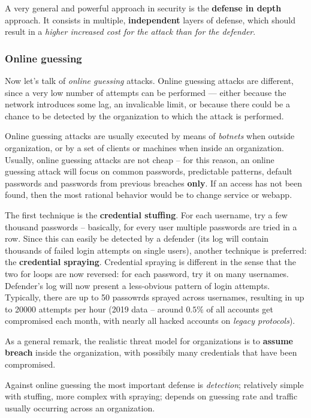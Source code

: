 \documentclass[10pt]{extbook}
\begin{document}
A very general and powerful approach in security is the \textbf{defense in
depth} approach. It consists in multiple, \textbf{independent} layers of
defense, which should result in a \emph{higher increased cost for the attack
than for the defender}.


\subsubsection{Online guessing}
Now let's talk of \emph{online guessing} attacks. Online guessing attacks are
different, since a very low number of attempts can be performed --- either
because the network introduces some lag, an invalicable limit, or because there
could be a chance to be detected by the organization to which the attack is
performed.

Online guessing attacks are usually executed by means of \emph{botnets} when
outside organization, or by a set of clients or machines when inside an
organization. Usually, online guessing attacks are not cheap -- for this
reason, an online guessing attack will focus on common passwords, predictable
patterns, default passwords and passwords from previous breaches \textbf{only}.
If an access has not been found, then the most rational behavior would be to
change service or webapp.

The first technique is the \textbf{credential stuffing}. For each username, try
a few thousand passwords -- basically, for every user multiple passwords are
tried in a row. Since this can easily be detected by a defender (its log will
contain thousands of failed login attempts on single users), another technique
is preferred: the \textbf{credential spraying}. Credential spraying is
different in the sense that the two for loops are now reversed: for each
password, try it on many usernames. Defender's log will now present a
less\--obvious pattern of login attempts. Typically, there are up to 50
passowrds sprayed across usernames, resulting in up to 20000 attempts per hour
(2019 data -- around $0.5\%$ of all accounts get compromised each month, with
nearly all hacked accounts on \emph{legacy protocols}).

As a general remark, the realistic threat model for organizations is to
\textbf{assume breach} inside the organization, with possibily many credentials
that have been compromised.

Against online guessing the most important defense is \emph{detection};
relatively simple with stuffing, more complex with spraying; depends on
guessing rate and traffic usually occurring across an organization.
\end{document}
